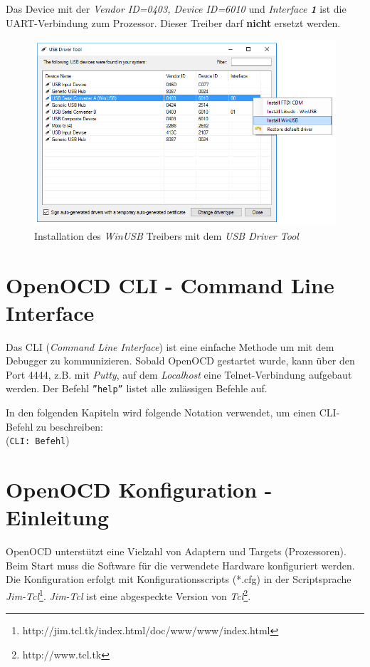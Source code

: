 Das Device mit der \textit{Vendor ID=0403, Device ID=6010} und \textit{Interface \textbf{1}} ist die UART-Verbindung zum Prozessor.
Dieser Treiber darf \textbf{nicht} ersetzt werden.

\begin{figure}[htbp]
	\centering
		\includegraphics[width=12cm,keepaspectratio]{images/InstallWinUSBDriver.png}
	\caption{Installation des \textit{WinUSB} Treibers mit dem \textit{USB Driver Tool}}
	\label{fig:InstallWinUSBDriver}
\end{figure}


\section{OpenOCD CLI - Command Line Interface}
Das CLI (\textit{Command Line Interface}) ist eine einfache Methode um mit dem Debugger zu kommunizieren.
Sobald OpenOCD gestartet wurde, kann über den Port 4444, z.B. mit \textit{Putty}, auf dem \textit{Localhost} eine Telnet-Verbindung aufgebaut werden.
Der Befehl \texttt{''help''} listet alle zulässigen Befehle auf.

In den folgenden Kapiteln wird folgende Notation verwendet, um einen CLI-Befehl zu beschreiben:\\
(\texttt{CLI: Befehl})


\section{OpenOCD Konfiguration - Einleitung}
OpenOCD unterstützt eine Vielzahl von Adaptern und Targets (Prozessoren).
Beim Start muss die Software für die verwendete Hardware konfiguriert werden.
Die Konfiguration erfolgt mit Konfigurationsscripts (*.cfg) in der Scriptsprache \textit{Jim-Tcl}\footnote{http://jim.tcl.tk/index.html/doc/www/www/index.html}.
\textit{Jim-Tcl} ist eine abgespeckte Version von \textit{Tcl}\footnote{http://www.tcl.tk}.

